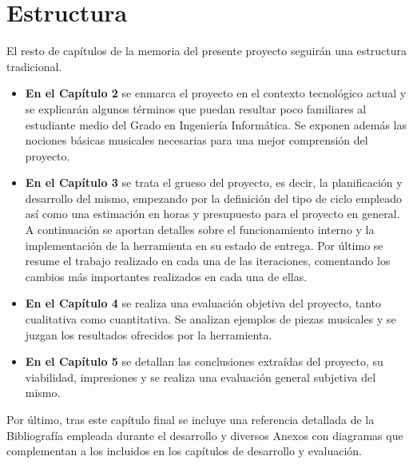  \section{Estructura}
  \label{sec:project_structure}
 El resto de capítulos de la memoria del presente proyecto seguirán una estructura tradicional. 
 \begin{itemize}
 	\item \textbf{En el Capítulo 2} se enmarca el proyecto en el contexto tecnológico actual y se explicarán algunos términos que puedan resultar poco familiares al estudiante medio del Grado en Ingeniería Informática. Se exponen además las nociones básicas musicales necesarias para una mejor comprensión del proyecto.
 	\item \textbf{En el Capítulo 3} se trata el grueso del proyecto, es decir, la planificación y desarrollo del mismo, empezando por la definición del tipo de ciclo empleado así como una estimación en horas y presupuesto para el proyecto en general. A continuación se aportan detalles sobre el funcionamiento interno y la implementación de la herramienta en su estado de entrega. Por último se resume el trabajo realizado en cada una de las iteraciones, comentando los cambios más importantes realizados en cada una de ellas.
  	\item \textbf{En el Capítulo 4} se realiza una evaluación objetiva del proyecto, tanto cualitativa como cuantitativa. Se analizan ejemplos de piezas musicales y se juzgan los resultados ofrecidos por la herramienta.
 	\item \textbf{En el Capítulo 5} se detallan las conclusiones extraídas del proyecto, su viabilidad, impresiones y se realiza una evaluación general subjetiva del mismo.
 \end{itemize}
 Por último, tras este capítulo final se incluye una referencia detallada de la Bibliografía empleada durante el desarrollo y diversos Anexos con diagramas que complementan a los incluidos en los capítulos de desarrollo y evaluación.
 
